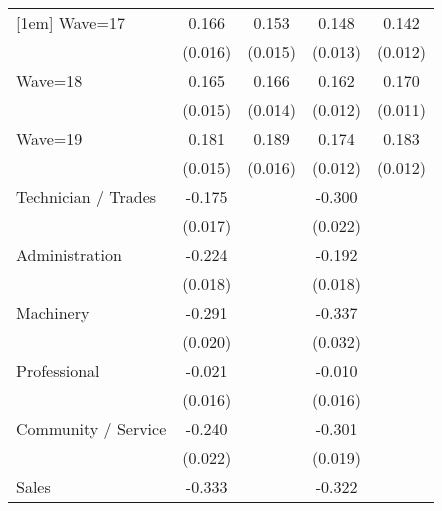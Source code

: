 {\begin{tabular}{l*{4}{c}}
[1em]
Wave=17             &       0.166\sym{***}&       0.153\sym{***}&       0.148\sym{***}&       0.142\sym{***}\\
                    &     (0.016)         &     (0.015)         &     (0.013)         &     (0.012)         \\
[1em]
Wave=18             &       0.165\sym{***}&       0.166\sym{***}&       0.162\sym{***}&       0.170\sym{***}\\
                    &     (0.015)         &     (0.014)         &     (0.012)         &     (0.011)         \\
[1em]
Wave=19             &       0.181\sym{***}&       0.189\sym{***}&       0.174\sym{***}&       0.183\sym{***}\\
                    &     (0.015)         &     (0.016)         &     (0.012)         &     (0.012)         \\
[1em]
Technician / Trades &      -0.175\sym{***}&                     &      -0.300\sym{***}&                     \\
                    &     (0.017)         &                     &     (0.022)         &                     \\
[1em]
Administration      &      -0.224\sym{***}&                     &      -0.192\sym{***}&                     \\
                    &     (0.018)         &                     &     (0.018)         &                     \\
[1em]
Machinery           &      -0.291\sym{***}&                     &      -0.337\sym{***}&                     \\
                    &     (0.020)         &                     &     (0.032)         &                     \\
[1em]
Professional        &      -0.021         &                     &      -0.010         &                     \\
                    &     (0.016)         &                     &     (0.016)         &                     \\
[1em]
Community / Service &      -0.240\sym{***}&                     &      -0.301\sym{***}&                     \\
                    &     (0.022)         &                     &     (0.019)         &                     \\
[1em]
Sales               &      -0.333\sym{***}&                     &      -0.322\sym{***}&                     \\

\end{tabular}}
